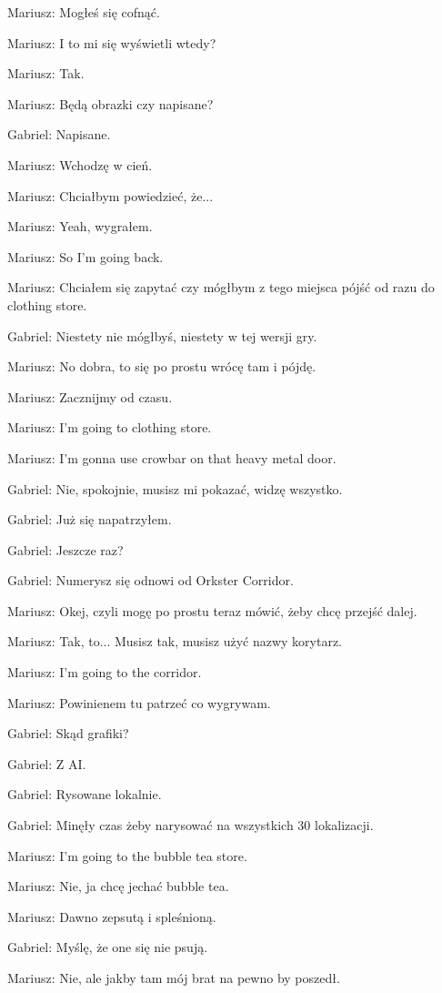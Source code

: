 Mariusz: Mogłeś się cofnąć.

Mariusz: I to mi się wyświetli wtedy?

Mariusz: Tak.

Mariusz: Będą obrazki czy napisane?

Gabriel: Napisane.

Mariusz: Wchodzę w cień.

Mariusz: Chciałbym powiedzieć, że...

Mariusz: Yeah, wygrałem.

Mariusz: So I'm going back.

Mariusz: Chciałem się zapytać czy mógłbym z tego miejsca pójść od razu do clothing store.

Gabriel: Niestety nie mógłbyś, niestety w tej wersji gry.

Mariusz: No dobra, to się po prostu wrócę tam i pójdę.

Mariusz: Zacznijmy od czasu.

Mariusz: I'm going to clothing store.

Mariusz: I'm gonna use crowbar on that heavy metal door.

Gabriel: Nie, spokojnie, musisz mi pokazać, widzę wszystko.

Gabriel: Już się napatrzyłem.

Gabriel: Jeszcze raz?

Gabriel: Numerysz się odnowi od Orkster Corridor.

Mariusz: Okej, czyli mogę po prostu teraz mówić, żeby chcę przejść dalej.

Mariusz: Tak, to... Musisz tak, musisz użyć nazwy korytarz.

Mariusz: I'm going to the corridor.

Mariusz: Powinienem tu patrzeć co wygrywam.

Gabriel: Skąd grafiki?

Gabriel: Z AI.

Gabriel: Rysowane lokalnie.

Gabriel: Minęły czas żeby narysować na wszystkich 30 lokalizacji.

Mariusz: I'm going to the bubble tea store.

Mariusz: Nie, ja chcę jechać bubble tea.

Mariusz: Dawno zepsutą i spleśnioną.

Gabriel: Myślę, że one się nie psują.

Mariusz: Nie, ale jakby tam mój brat na pewno by poszedł.

